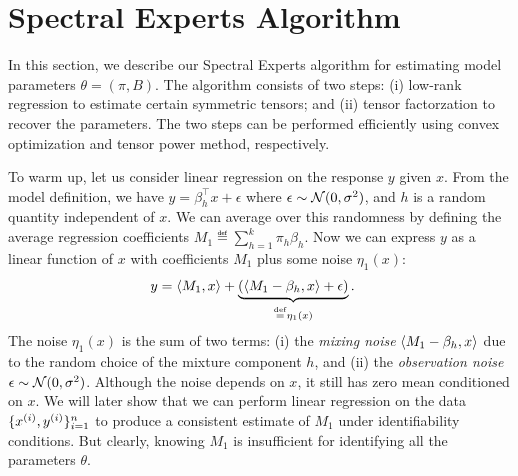 \section{Spectral Experts Algorithm}
\label{sec:algo}

In this section, we describe our Spectral Experts algorithm
for estimating model parameters $\theta = (\pi, B)$.
The algorithm consists of two steps:
(i) low-rank regression to estimate certain symmetric tensors;
and (ii) tensor factorzation to recover the parameters.
The two steps can be performed efficiently using
convex optimization and tensor power method, respectively.

To warm up, let us consider linear regression
on the response $y$ given $x$.
From the model definition, we have $y = \beta_h^\top x + \epsilon$ where
$\epsilon \sim \mathcal{N}(0, \sigma^2)$, and $h$ is a random quantity
independent of $x$.
We can average over this randomness by defining
the average regression coefficients
$M_1 \eqdef \sum_{h=1}^k \pi_h \beta_h$.
Now we can express $y$ as a linear function of $x$ with coefficients $M_1$
plus some noise $\eta_1(x)$:
\begin{align}
  y &= \langle M_1, x \rangle +
  \underbrace{(\langle M_1 - \beta_h, x \rangle + \epsilon)}_{\stackrel{\rm def}{=} \eta_1(x)}. \label{eqn:y1}
\end{align}
The noise $\eta_1(x)$ is the sum of two terms:
(i) the \emph{mixing noise} $\langle M_1 - \beta_h, x \rangle$
due to the random choice of the mixture component $h$,
and (ii) the \emph{observation noise} $\epsilon \sim \mathcal{N}(0, \sigma^2)$.
Although the noise depends on $x$,
it still has zero mean conditioned on $x$.
We will later show that we can
perform linear regression on the data $\{x^{(i)},
y^{(i)}\}_{i=1}^{n}$ to produce a consistent estimate of $M_1$
under identifiability conditions.
But clearly, knowing $M_1$ is insufficient
for identifying all the parameters $\theta$.

